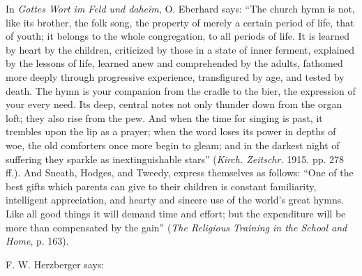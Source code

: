 In \emph{Gottes Wort im Feld und daheim}, O. Eberhard says: “The church hymn is not, like its brother, the folk song, the property of merely a certain period of life, that of youth; it belongs to the whole congregation, to all periods of life. It is learned by heart by the children, criticized by those in a state of inner ferment, explained by the lessons of life, learned anew and comprehended by the adults, fathomed more deeply through progressive experience, transfigured by age, and tested by death. The hymn is your companion from the cradle to the bier, the expression of your every need. Its deep, central notes not only thunder down from the organ loft; they also rise from the pew. And when the time for singing is past, it trembles upon the lip as a prayer; when the word loses its power in depths of woe, the old comforters once more begin to gleam; and in the darkest night of suffering they sparkle as inextinguishable stars” (\emph{Kirch. Zeitschr.} 1915. pp. 278 ff.). And Sneath, Hodges, and
Tweedy, express themselves as follows: “One of the best gifts which parents can give to their children is constant familiarity, intelligent appreciation, and hearty and sincere use of the world's great hymns. Like all good things it will demand time and effort; but the expenditure will be more than compensated by the gain” (\emph{The Religious Training in the School and Home}, p. 163).

F. W. Herzberger says:

